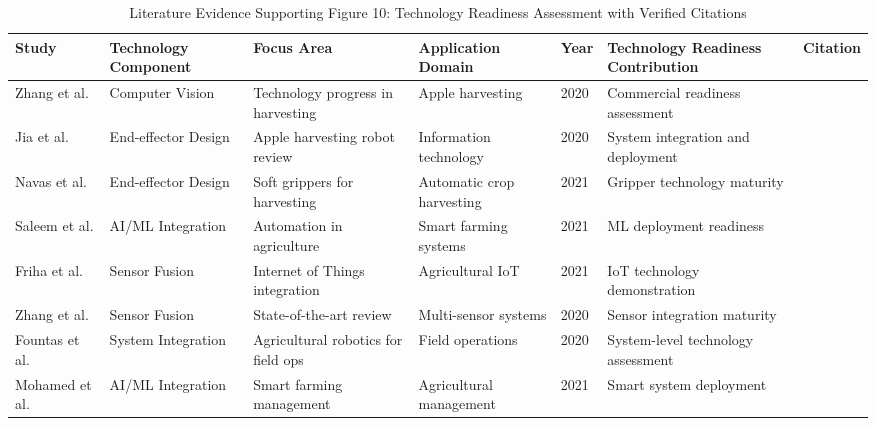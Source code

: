 \begin{table*}[htbp]
\centering
\small
\caption{Literature Evidence Supporting Figure 10: Technology Readiness Assessment with Verified Citations}
\label{tab:verified_figure10_support}
\begin{tabular}{p{}p{}p{}p{}p{}p{}p{}}
\toprule
\textbf{Study} & \textbf{Technology Component} & \textbf{Focus Area} & \textbf{Application Domain} & \textbf{Year} & \textbf{Technology Readiness Contribution} & \textbf{Citation} \\ \midrule

Zhang et al. & Computer Vision & Technology progress in harvesting & Apple harvesting & 2020 & Commercial readiness assessment & \cite{zhang2020technology} \\

Jia et al. & End-effector Design & Apple harvesting robot review & Information technology & 2020 & System integration and deployment & \cite{jia2020apple} \\

Navas et al. & End-effector Design & Soft grippers for harvesting & Automatic crop harvesting & 2021 & Gripper technology maturity & \cite{navas2021soft} \\

Saleem et al. & AI/ML Integration & Automation in agriculture & Smart farming systems & 2021 & ML deployment readiness & \cite{saleem2021automation} \\

Friha et al. & Sensor Fusion & Internet of Things integration & Agricultural IoT & 2021 & IoT technology demonstration & \cite{friha2021internet} \\

Zhang et al. & Sensor Fusion & State-of-the-art review & Multi-sensor systems & 2020 & Sensor integration maturity & \cite{zhang2020state} \\

Fountas et al. & System Integration & Agricultural robotics for field ops & Field operations & 2020 & System-level technology assessment & \cite{fountas2020agricultural} \\

Mohamed et al. & AI/ML Integration & Smart farming management & Agricultural management & 2021 & Smart system deployment & \cite{mohamed2021smart} \\

\bottomrule
\end{tabular}
\end{table*}

